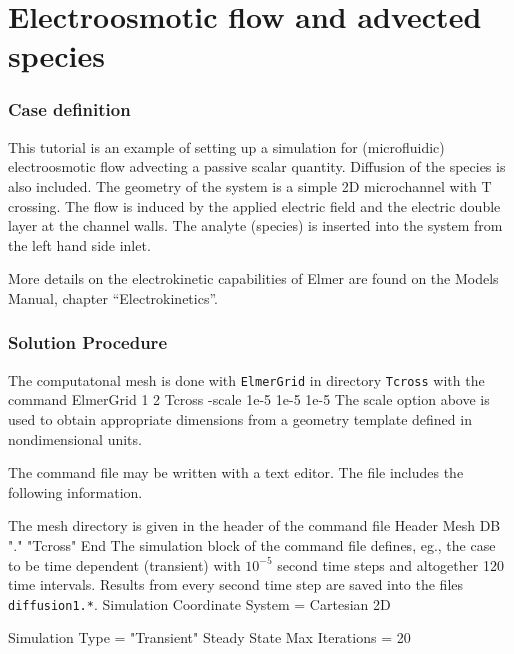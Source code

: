 \chapter{Electroosmotic flow and advected species}



\subsection*{Case definition}

This tutorial is an example of setting up a simulation for
(microfluidic) electroosmotic flow advecting a passive scalar
quantity. Diffusion of the species is also included. The geometry of
the system is a simple 2D microchannel with T crossing. The flow is
induced by the applied electric field and the electric double layer at
the channel walls. The analyte (species) is inserted into the system
from the left hand side inlet.

More details on the electrokinetic capabilities of Elmer are found on
the Models Manual, chapter ``Electrokinetics''.


\subsection*{Solution Procedure}

The computatonal mesh is done with \texttt{ElmerGrid} in directory
\texttt{Tcross} with the command 
%
\ttbegin
ElmerGrid 1 2 Tcross -scale 1e-5 1e-5 1e-5
\ttend
%
The scale option above is used to obtain appropriate dimensions from a
geometry template defined in nondimensional units.

The command file may be written with a text editor. The file includes
the following information. 

The mesh directory is given in the header of the command file
%
\ttbegin
Header
  Mesh DB "." "Tcross"
End
\ttend
%
The simulation block of the command file defines, eg., the case to be time
dependent (transient) with $10^{-5}$ second time steps and altogether
120 time intervals. Results from every second time step are saved into
the files \texttt{diffusion1.*}.
%
\ttbegin
Simulation
  Coordinate System = Cartesian 2D

  Simulation Type = "Transient"
  Steady State Max Iterations = 20

